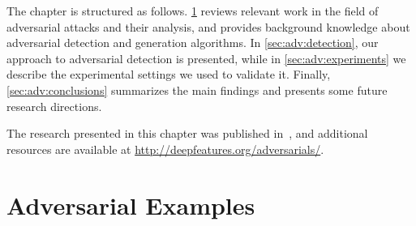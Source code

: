 

The chapter is structured as follows.
\ref{sec:adv:rel-work} reviews relevant work in the field of adversarial attacks and their analysis, and provides background knowledge about adversarial detection and generation algorithms.
In \ref{sec:adv:detection}, our approach to adversarial detection is presented, while in \ref{sec:adv:experiments} we describe the experimental settings we used to validate it.
Finally, \ref{sec:adv:conclusions} summarizes the main findings and presents some future research directions.

The research presented in this chapter was published in~\cite{carrara2017detecting,carrara2018adversarial}, and additional resources are available at \url{http://deepfeatures.org/adversarials/}.


\section{Adversarial Examples}
\label{sec:adv:rel-work}

